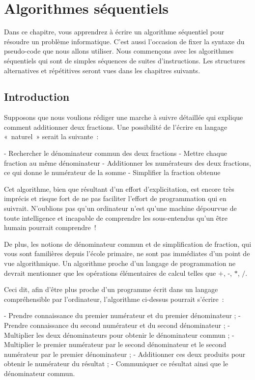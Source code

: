 \chapter{Algorithmes séquentiels}

	Dans ce chapitre, vous apprendrez à écrire un algorithme séquentiel pour
	résoudre un problème informatique. C’est aussi
	l’occasion de fixer la syntaxe du pseudo-code que nous
	allons utiliser. Nous commençons avec les algorithmes
	séquentiels qui sont de simples séquences de suites
	d’instructions. Les structures alternatives et
	répétitives seront vues dans les chapitres suivants.


	\section{Introduction}

		Supposons que nous voulions rédiger une marche
		à suivre détaillée qui explique comment additionner deux fractions. Une
		possibilité de l’écrire en langage «~naturel~» serait la suivante~:

		\begin{Pseudocode}
			\Stmt - Rechercher le dénominateur commun des deux fractions
			\Stmt - Mettre chaque fraction au même dénominateur
			\Stmt - Additionner les numérateurs des deux fractions, ce qui donne le numérateur de la somme
			\Stmt - Simplifier la fraction obtenue
		\end{Pseudocode}
		
		Cet algorithme, bien que résultant d’un effort
		d’explicitation, est encore très imprécis et risque fort de ne pas
		faciliter l’effort de programmation qui en suivrait. N’oublions pas
		qu’un ordinateur n’est qu’une machine dépourvue de toute intelligence
		et incapable de comprendre les sous-entendus qu’un être humain pourrait
		comprendre~!

		De plus, les notions de dénominateur commun et
		de simplification de fraction, qui vous sont 
		familières depuis l’école primaire, 
		ne sont pas immédiates d’un point de
		vue algorithmique. Un algorithme proche d’un langage
		de programmation ne devrait mentionner que les opérations élémentaires
		de calcul telles que $+$, -, $*$, $/$.

		Ceci dit, afin d’être plus proche d’un
		programme écrit dans un langage compréhensible par l’ordinateur,
		l’algorithme ci-dessus pourrait s’écrire~:

		\begin{Pseudocode}
			\Stmt - Prendre connaissance du premier numérateur et du premier dénominateur ;
			\Stmt - Prendre connaissance du second numérateur et du second dénominateur ;
			\Stmt - Multiplier les deux dénominateurs pour obtenir le dénominateur commun ;
			\Stmt - Multiplier le premier numérateur par le second dénominateur
			\Stmt \Indent et le second numérateur par le premier dénominateur ;
			\Stmt - Additionner ces deux produits pour obtenir le numérateur du résultat ;
			\Stmt - Communiquer ce résultat ainsi que le dénominateur commun.
		\end{Pseudocode}

